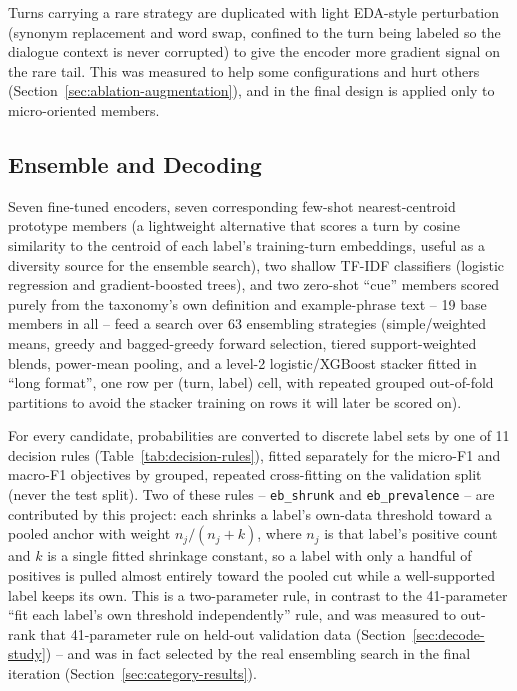 Turns carrying a rare strategy are duplicated with light EDA-style
perturbation (synonym replacement and word swap, confined to the turn being
labeled so the dialogue context is never corrupted) to give the encoder more
gradient signal on the rare tail. This was measured to help some
configurations and hurt others (Section~\ref{sec:ablation-augmentation}), and
in the final design is applied only to micro-oriented members.

\subsection{Ensemble and Decoding}
\label{sec:design-ensemble}

Seven fine-tuned encoders, seven corresponding few-shot nearest-centroid
prototype members (a lightweight alternative that scores a turn by cosine
similarity to the centroid of each label's training-turn embeddings, useful
as a diversity source for the ensemble search), two shallow TF-IDF
classifiers (logistic regression and gradient-boosted trees), and two
zero-shot ``cue'' members scored purely from the taxonomy's own definition
and example-phrase text -- 19 base members in all -- feed a search over 63
ensembling strategies (simple/weighted means, greedy and bagged-greedy
forward selection, tiered support-weighted blends, power-mean pooling, and a
level-2 logistic/XGBoost stacker fitted in ``long format'', one row per
(turn, label) cell, with repeated grouped out-of-fold partitions to avoid the
stacker training on rows it will later be scored on).

For every candidate, probabilities are converted to discrete label sets by
one of 11 decision rules (Table~\ref{tab:decision-rules}), fitted separately
for the micro-F1 and macro-F1 objectives by grouped, repeated cross-fitting
on the validation split (never the test split). Two of these rules --
\texttt{eb\_shrunk} and \texttt{eb\_prevalence} -- are contributed by this
project: each shrinks a label's own-data threshold toward a pooled anchor
with weight $n_j/(n_j+k)$, where $n_j$ is that label's positive count and $k$
is a single fitted shrinkage constant, so a label with only a handful of
positives is pulled almost entirely toward the pooled cut while a
well-supported label keeps its own. This is a two-parameter rule, in
contrast to the 41-parameter ``fit each label's own threshold independently''
rule, and was measured to out-rank that 41-parameter rule on held-out
validation data (Section~\ref{sec:decode-study}) -- and was in fact selected
by the real ensembling search in the final iteration
(Section~\ref{sec:category-results}).

